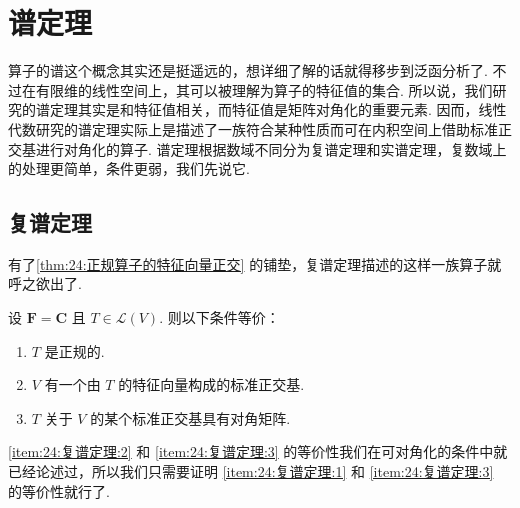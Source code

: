 \section{谱定理}

算子的谱这个概念其实还是挺遥远的，想详细了解的话就得移步到泛函分析了. 不过在有限维的线性空间上，其可以被理解为算子的特征值的集合. 所以说，我们研究的谱定理其实是和特征值相关，而特征值是矩阵对角化的重要元素. 因而，线性代数研究的谱定理实际上是描述了一族符合某种性质而可在内积空间上借助标准正交基进行对角化的算子. 谱定理根据数域不同分为复谱定理和实谱定理，复数域上的处理更简单，条件更弱，我们先说它.

\subsection{复谱定理}

有了\autoref{thm:24:正规算子的特征向量正交} 的铺垫，复谱定理描述的这样一族算子就呼之欲出了.

\begin{theorem} 
    设 $ \mathbf{F} = \mathbf{C} $ 且 $ T \in \mathcal{L}(V) $. 则以下条件等价：
    \begin{enumerate}
        \item \label{item:24:复谱定理:1}
              $ T $ 是正规的.

        \item \label{item:24:复谱定理:2}
              $ V $ 有一个由 $ T $ 的特征向量构成的标准正交基.

        \item \label{item:24:复谱定理:3}
              $ T $ 关于 $ V $ 的某个标准正交基具有对角矩阵.
    \end{enumerate}
\end{theorem}

\ref*{item:24:复谱定理:2} 和 \ref*{item:24:复谱定理:3} 的等价性我们在可对角化的条件中就已经论述过，所以我们只需要证明 \ref*{item:24:复谱定理:1} 和 \ref*{item:24:复谱定理:3} 的等价性就行了.


